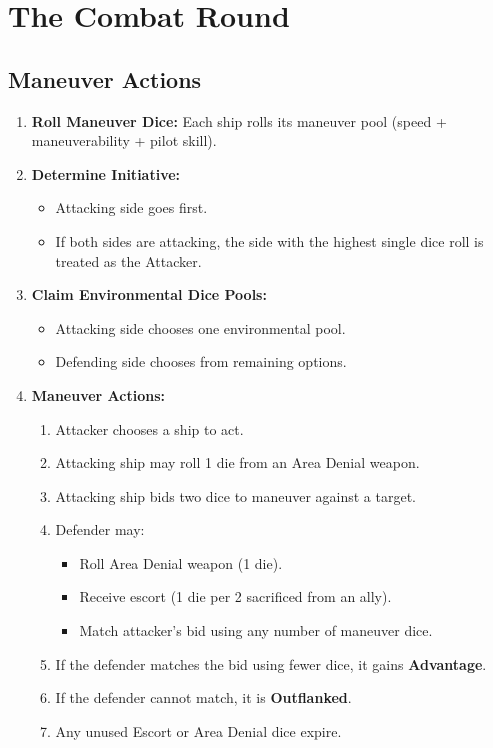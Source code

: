 \documentclass[11pt]{article}
\begin{document}
\section{The Combat Round}

\subsection{Maneuver Actions}

\begin{enumerate}
    \item \textbf{Roll Maneuver Dice:} Each ship rolls its maneuver pool (speed + maneuverability + pilot skill).
    
    \item \textbf{Determine Initiative:} 
    \begin{itemize}
        \item Attacking side goes first.
        \item If both sides are attacking, the side with the highest single dice roll is treated as the Attacker.
    \end{itemize}

    \item \textbf{Claim Environmental Dice Pools:}
    \begin{itemize}
        \item Attacking side chooses one environmental pool.
        \item Defending side chooses from remaining options.
    \end{itemize}

    \item \textbf{Maneuver Actions:}
    \begin{enumerate}
        \item Attacker chooses a ship to act.
        \item Attacking ship may roll 1 die from an Area Denial weapon.
        \item Attacking ship bids two dice to maneuver against a target.
        \item Defender may:
        \begin{itemize}
            \item Roll Area Denial weapon (1 die).
            \item Receive escort (1 die per 2 sacrificed from an ally).
            \item Match attacker’s bid using any number of maneuver dice.
        \end{itemize}
        \item If the defender matches the bid using fewer dice, it gains \textbf{Advantage}.
        \item If the defender cannot match, it is \textbf{Outflanked}.
        \item Any unused Escort or Area Denial dice expire.
    \end{enumerate}


\end{enumerate}
\end{document}

